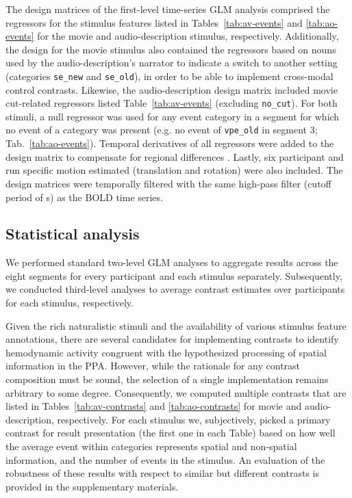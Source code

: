 \documentclass[english]{article}
\begin{document}
The design matrices of the first-level time-series GLM analysis comprised the
regressors for the stimulus features listed in Tables~\ref{tab:av-events} and
\ref{tab:ao-events} for the movie and audio-description stimulus, respectively.
Additionally, the design for the movie stimulus also contained the
regressors based on nouns used by the audio-description's narrator to indicate
a switch to another setting (categories \texttt{se\_new} and \texttt{se\_old}),
in order to be able to implement cross-modal control contrasts.
Likewise, the audio-description design matrix included movie cut-related regressors
listed Table~\ref{tab:av-events} (excluding \texttt{no\_cut}).
For both stimuli, a null regressor was used for any event category in a segment
for which no event of a category was present (e.g. no event of
\texttt{vpe\_old} in segment 3; Tab.~\ref{tab:ao-events}).
Temporal derivatives of all regressors were added to the design matrix to compensate for
regional differences \citep{friston1998event}.
Lastly, six participant and run specific motion estimated (translation and rotation)
were also included.
The design matrices were temporally filtered with the same high-pass filter (cutoff period of
\unit[150]{s}) as the BOLD time series.


\subsection{Statistical analysis}

We performed standard two-level GLM analyses to aggregate results across the eight
segments for every participant and each stimulus separately.
Subsequently, we conducted third-level analyses to average contrast estimates
over participants for each stimulus, respectively.

Given the rich naturalistic stimuli and the availability of various stimulus
feature annotations, there are several candidates for implementing contrasts to
identify hemodynamic activity congruent with the hypothesized processing of
spatial information in the PPA. However, while the rationale for any contrast
composition must be sound, the selection of a single implementation remains
arbitrary to some degree. Consequently, we computed multiple contrasts that are
listed in Tables~\ref{tab:av-contrasts} and \ref{tab:ao-contrasts} for movie
and audio-description, respectively. For each stimulus we, subjectively, picked
a primary contrast for result presentation (the first one in each Table) based
on how well the average event within categories represents spatial and
non-spatial information, and the number of events in the stimulus.
An evaluation of the robustness of these results with respect to similar but
different contrasts is provided in the supplementary materials.
\end{document}
